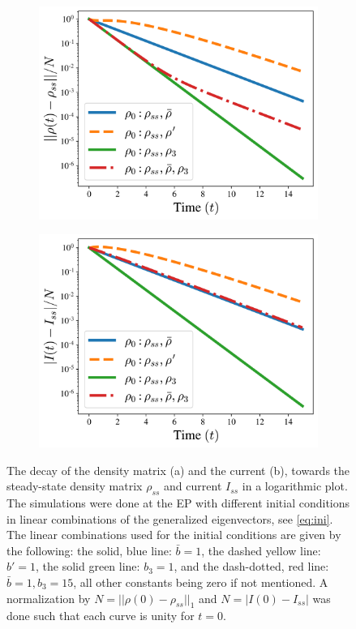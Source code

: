 \documentclass[../main.tex]{subfiles}
\begin{document}
\begin{figure}[H]
\centering
\begin{subfigure}[t]{.5\textwidth}
  \centering
  \includegraphics[width=\linewidth]{figures/rho_diff_rho0_v4.png}
  \caption{}
  \label{fig:rhodiffrho0}
\end{subfigure}%
\begin{subfigure}[t]{.5\textwidth}
  \centering
  \includegraphics[width=\linewidth]{figures/I_diff_rho0_nonvis.png}
  \caption{}
  \label{fig:Idiffrho0}
\end{subfigure}
\caption{The decay of the density matrix (a) and the current (b), towards the steady-state density matrix $\rho_{ss}$ and current $I_{ss}$ in a logarithmic plot. The simulations were done at the EP with different initial conditions in linear combinations of the generalized eigenvectors, see \cref{eq:ini}. The linear combinations used for the initial conditions are given by the following: the solid, blue line: $\bar b = 1$, the dashed yellow line: $b'=1$, the solid green line: $b_3=1$, and the dash-dotted, red line: $\bar b=1, b_3=15$, all other constants being zero if not mentioned. A normalization by $N=||\rho(0) - \rho_{ss}||_1$ and $N=|I(0) - I_{ss}|$ was done such that each curve is unity for $t=0$.}
\label{fig:diffrho}
\end{figure}
\end{document}
